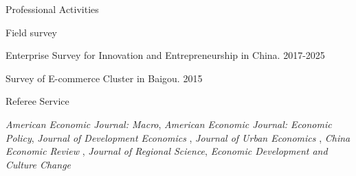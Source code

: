 \documentclass{resume} %
\begin{document}
\begin{rSection}{Professional Activities}

\begin{rSubsection}{Field survey}{}{}{}
\item Enterprise Survey for Innovation and Entrepreneurship in China. 2017-2025
\item Survey of E-commerce Cluster in Baigou. 2015
\end{rSubsection}

\begin{rSubsection}{Referee Service}{}{}{}
\item {\em American Economic Journal: Macro}, {\em American Economic Journal: Economic Policy}, {\em Journal of Development Economics} , {\em Journal of Urban Economics} , {\em China Economic Review} , {\em Journal of Regional Science}, {\em Economic Development and Culture Change} 
\end{rSubsection}



\end{rSection}




\clearpage
\clearpage
\end{document}
